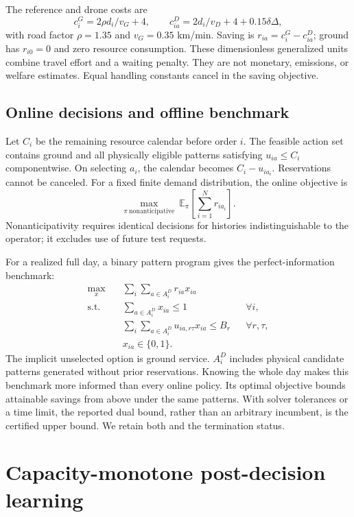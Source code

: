 \documentclass[11pt,a4paper]{article}
\begin{document}
The reference and drone costs are
\begin{equation}
c_i^G=2\rho d_i/v_G+4,\qquad c_{ia}^D=2d_i/v_D+4+0.15\delta\Delta,
\end{equation}
with road factor $\rho=1.35$ and $v_G=0.35$ km/min. Saving is $r_{ia}=c_i^G-c_{ia}^D$; ground has $r_{i0}=0$ and zero resource consumption. These dimensionless generalized units combine travel effort and a waiting penalty. They are not monetary, emissions, or welfare estimates. Equal handling constants cancel in the saving objective.

\subsection{Online decisions and offline benchmark}
Let $C_i$ be the remaining resource calendar before order $i$. The feasible action set contains ground and all physically eligible patterns satisfying $u_{ia}\leq C_i$ componentwise. On selecting $a_i$, the calendar becomes $C_i-u_{ia_i}$. Reservations cannot be canceled. For a fixed finite demand distribution, the online objective is
\begin{equation}
\max_{\pi\ \mathrm{nonanticipative}}\ \mathbb E_\pi\left[\sum_{i=1}^N r_{ia_i}\right].
\end{equation}
Nonanticipativity requires identical decisions for histories indistinguishable to the operator; it excludes use of future test requests.

For a realized full day, a binary pattern program gives the perfect-information benchmark:
\begin{align}
\max_x\quad &\sum_i\sum_{a\in A_i^D}r_{ia}x_{ia}\\
\text{s.t.}\quad &\sum_{a\in A_i^D}x_{ia}\leq1 &&\forall i,\\
&\sum_i\sum_{a\in A_i^D}u_{ia,r\tau}x_{ia}\leq B_r &&\forall r,\tau,\\
&x_{ia}\in\{0,1\}.\nonumber
\end{align}
The implicit unselected option is ground service. $A_i^D$ includes physical candidate patterns generated without prior reservations. Knowing the whole day makes this benchmark more informed than every online policy. Its optimal objective bounds attainable savings from above under the same patterns. With solver tolerances or a time limit, the reported dual bound, rather than an arbitrary incumbent, is the certified upper bound. We retain both and the termination status.

\section{Capacity-monotone post-decision learning}
\end{document}

